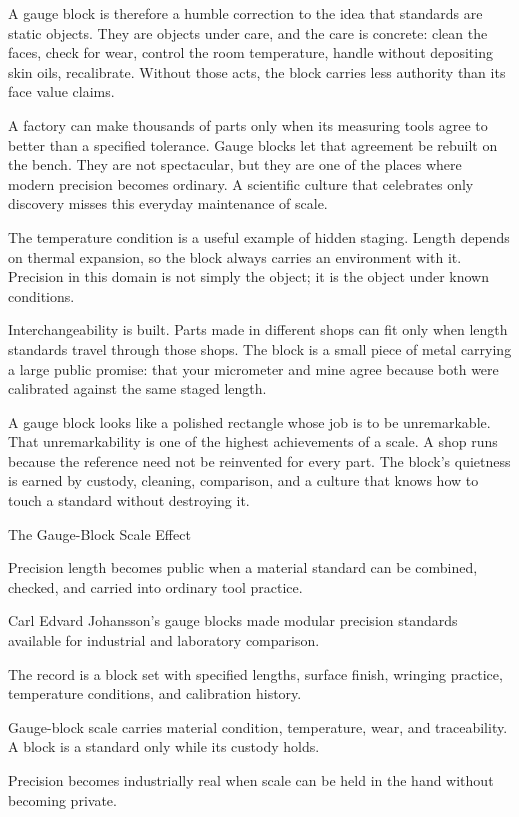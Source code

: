 A gauge block is therefore a humble correction to the idea that standards
are static objects. They are objects under care, and the care is concrete:
clean the faces, check for wear, control the room temperature, handle
without depositing skin oils, recalibrate. Without those acts, the block
carries less authority than its face value claims.

A factory can make thousands of parts only when its measuring tools agree
to better than a specified tolerance. Gauge blocks let that agreement be
rebuilt on the bench. They are not spectacular, but they are one of the
places where modern precision becomes ordinary. A scientific culture that
celebrates only discovery misses this everyday maintenance of scale.

The temperature condition is a useful example of hidden staging. Length
depends on thermal expansion, so the block always carries an environment
with it. Precision in this domain is not simply the object; it is the
object under known conditions.

Interchangeability is built. Parts made in different shops can fit only
when length standards travel through those shops. The block is a small
piece of metal carrying a large public promise: that your micrometer and
mine agree because both were calibrated against the same staged length.

A gauge block looks like a polished rectangle whose job is to be
unremarkable. That unremarkability is one of the highest achievements of
a scale. A shop runs because the reference need not be reinvented for
every part. The block's quietness is earned by custody, cleaning,
comparison, and a culture that knows how to touch a standard without
destroying it.

\begin{phenom}{The Gauge-Block Scale Effect~\cite{johansson1901}}
\label{ph:gauge-block-scale}

\PhStatement
Precision length becomes public when a material standard can be combined,
checked, and carried into ordinary tool practice.

\PhOrigin
Carl Edvard Johansson's gauge blocks made modular precision standards
available for industrial and laboratory comparison.

\PhObservation
The record is a block set with specified lengths, surface finish, wringing
practice, temperature conditions, and calibration history.

\PhConstraint
Gauge-block scale carries material condition, temperature, wear, and
traceability. A block is a standard only while its custody holds.

\PhConsequence
Precision becomes industrially real when scale can be held in the hand without
becoming private.
\end{phenom}

